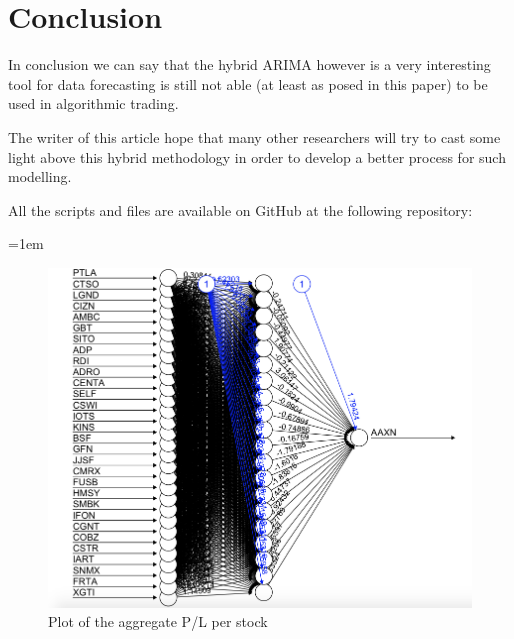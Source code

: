 \documentclass[twocolumn]{article}
\begin{document}
\section{Conclusion}
In conclusion we can say that the hybrid ARIMA however is a very interesting tool for data forecasting is still not able (at least as posed in this paper) to be used in algorithmic trading. 

The writer of this article hope that many other researchers will try to cast some light above this hybrid methodology in order to develop a better process for such modelling.

All the scripts and files are available on GitHub at the following repository: 

\newpage
\emergencystretch=1em
\sloppy
\printbibliography

\newpage
\begin{figure}
    \centering
    \includegraphics[width=1\linewidth, ]{Paper/images/NN_plot}
    \caption{Plot of the aggregate P/L per stock}
    \label{nn_portfolio}
\end{figure}
\end{document}
